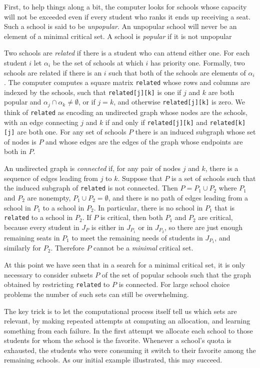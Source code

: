 \documentclass[12pt]{article}
\theoremstyle{definition}
\begin{document}
First, to help things along a bit, the computer looks for schools
whose capacity will not be exceeded even if every student who ranks it
ends up receiving a seat.  Such a school is said to be
\emph{unpopular}.  An unpopular school will never be an element of a
minimal critical set. A school is \emph{popular} if it is not
unpopular

Two schools are \emph{related} if there is a student who can attend
either one.  For each student $i$ let $\alpha_i$ be the set of schools
at which $i$ has priority one.  Formally, two schools are related if
there is an $i$ such that both of the schools are elements of
$\alpha_i$.  The computer computes a square matrix \texttt{related}
whose rows and columns are indexed by the schools, such that
\texttt{related[j][k]} is one if $j$ and $k$ are both popular and
$\alpha_j \cap \alpha_k \ne \emptyset$, or if $j = k$, and otherwise
\texttt{related[j][k]} is zero.  We think of \texttt{related} as
encoding an undirected graph whose nodes are the schools, with an edge
connecting $j$ and $k$ if and only if \texttt{related[j][k]} and
\texttt{related[k][j]} are both one.  For any set of schools $P$ there
is an induced subgraph whose set of nodes is $P$ and whose edges are
the edges of the graph whose endpoints are both in $P$.

An undirected graph is \emph{connected} if, for any pair of nodes $j$
and $k$, there is a sequence of edges leading from $j$ to $k$.
Suppose that $P$ is a set of schools such that the induced subgraph of
\texttt{related} is not connected.  Then $P = P_1 \cup P_2$ where
$P_1$ and $P_2$ are nonempty, $P_1 \cup P_2 = \emptyset$, and there is
no path of edges leading from a school in $P_1$ to a school in $P_2$.
In particular, there is no school in $P_1$ that is \texttt{related} to
a school in $P_2$.  If $P$ is critical, then both $P_1$ and $P_2$ are
critical, because every student in $J_P$ is either in $J_{P_1}$ or in
$J_{P_2}$, so there are just enough remaining seats in $P_1$ to meet
the remaining needs of students in $J_{P_1}$, and similarly for $P_2$.
Therefore $P$ cannot be a \emph{minimal} critical set.

At this point we have seen that in a search for a minimal critical
set, it is only necessary to consider subsets $P$ of the set of
popular schools such that the graph obtained by restricting
\texttt{related} to $P$ is connected.  For large school choice
problems the number of such sets can still be overwhelming.

The key trick is to let the computational process itself tell us which
sets are relevant, by making repeated attempts at computing an
allocation, and learning something from each failure.  In the first
attempt we allocate each school to those students for whom the school
is the favorite.  Whenever a school's quota is exhausted, the students
who were consuming it switch to their favorite among the remaining
schools.  As our initial example illustrated, this may succeed.
\end{document}
